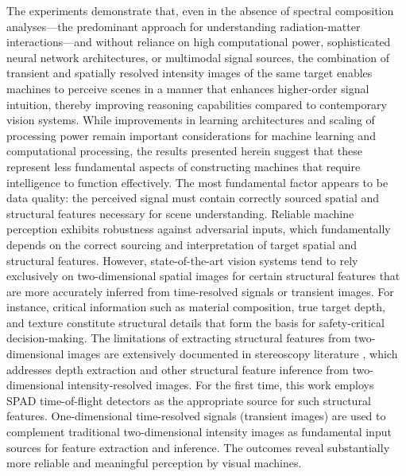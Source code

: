 \documentclass[12pt,a4paper,oneside]{report}
\begin{document}
The experiments demonstrate that, even in the absence of spectral composition analyses—the predominant approach for understanding radiation-matter interactions—and without reliance on high computational power, sophisticated neural network architectures, or multimodal signal sources, the combination of transient and spatially resolved intensity images of the same target enables machines to perceive scenes in a manner that enhances higher-order signal intuition, thereby improving reasoning capabilities compared to contemporary vision systems. While improvements in learning architectures and scaling of processing power remain important considerations for machine learning and computational processing, the results presented herein suggest that these represent less fundamental aspects of constructing machines that require intelligence to function effectively. The most fundamental factor appears to be data quality: the perceived signal must contain correctly sourced spatial and structural features necessary for scene understanding. Reliable machine perception exhibits robustness against adversarial inputs, which fundamentally depends on the correct sourcing and interpretation of target spatial and structural features. However, state-of-the-art vision systems tend to rely exclusively on two-dimensional spatial images for certain structural features that are more accurately inferred from time-resolved signals or transient images. For instance, critical information such as material composition, true target depth, and texture constitute structural details that form the basis for safety-critical decision-making. The limitations of extracting structural features from two-dimensional images are extensively documented in stereoscopy literature \cite{laga2022}, which addresses depth extraction and other structural feature inference from two-dimensional intensity-resolved images. For the first time, this work employs SPAD time-of-flight detectors as the appropriate source for such structural features. One-dimensional time-resolved signals (transient images) are used to complement traditional two-dimensional intensity images as fundamental input sources for feature extraction and inference. The outcomes reveal substantially more reliable and meaningful perception by visual machines.
\end{document}
